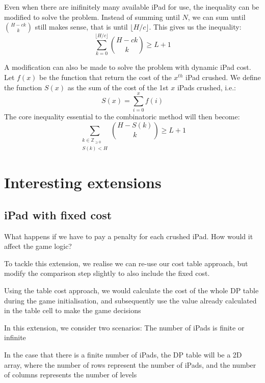 \documentclass[12pt,a4paper,oneside]{report}
\begin{document}
Even when there are inifinitely many available iPad for use, the inequality can be modified to solve the problem. Instead of summing until $N$, we can sum until ${H-ck \choose k}$ still makes sense, that is until $\lfloor H/c \rfloor$. This gives us the inequality: \[\sum_{k=0}^{\lfloor H/c \rfloor} {H-ck \choose k} \geq L+1\]

A modification can also be made to solve the problem with dynamic iPad cost. Let $f(x)$ be the function that return the cost of the $x^{th}$ iPad crushed. We define the function $S(x)$ as the sum of the cost of the 1st $x$ iPads crushed, i.e.: \[S(x) = \sum_{i=0}^x f(i)\] The core inequality essential to the combinatoric method will then become: \[\sum_{\substack{k \in \mathbb{Z}_{\geq 0}\\ S(k) < H}} {H-S(k) \choose k} \geq L+1\]


\chapter{Interesting extensions}
\section{iPad with fixed cost}

What happens if we have to pay a penalty for each crushed iPad. How would it affect the game logic?

To tackle this extension, we realise we can re-use our cost table approach, but modify the comparison step slightly to also include the fixed cost. 

Using the table cost approach, we would calculate the cost of the whole DP table during the game initialisation, and subsequently use the value already calculated in the table cell to make the game decisions

In this extension, we consider two scenarios: The number of iPads is finite or infinite

In the case that there is a finite number of iPads, the DP table will be a 2D array, where the number of rows represent the number of iPads, and the number of columns represents the number of levels
\end{document}
